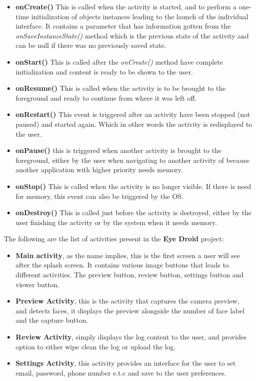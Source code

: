 \begin{itemize}
\item{\bf onCreate()} This is called when the activity is started, and to perform a one-time initialization of objects instances leading to the launch of the individual interface. It contains a parameter that has information gotten from the {\it onSaveInstanceState()} method which is the previous state of the activity and can be null if there was no previously saved state.
\item{\bf onStart()} This is called after the {\it onCreate()} method have complete initialization and content is ready to be shown to the user.
\item{\bf onResume()} This is called when the activity is to be brought to the foreground and ready to continue from where it was left off.
\item{\bf onRestart()} This event is triggered after an activity have been stopped (not paused) and started again. Which in other words the activity is redisplayed to the user.
\item{\bf onPause()} this is triggered when another activity is brought to the foreground, either by the user when navigating to another activity of because another application with higher priority needs memory.
\item{\bf onStop()} This is called when the activity is no longer visible. If there is need for memory, this event can also be triggered by the OS.
\item{\bf onDestroy()} This is called just before the activity is destroyed, either by the user finishing the activity or by the system when it needs memory.
\end{itemize}

The following are the list of activities present in the {\bf Eye Droid} project:
\begin{itemize}
\item{\bf Main activity}, as the name implies, this is the first screen a user will see after the splash screen. It contains various image buttons that leads to different activities. The preview button, review button, settings button and viewer button.
\item{\bf Preview Activity}, this is the activity that captures the camera preview, and detects faces, it displays the preview alongside the number of face label and the capture button.
\item{\bf Review Activity}, simply displays the log content to the user, and provides option to either wipe clean the log or upload the log.
\item{\bf Settings Activity}, this activity provides an interface for the user to set email, password, phone number e.t.c and save to the user preferences. 
\end{itemize} 

